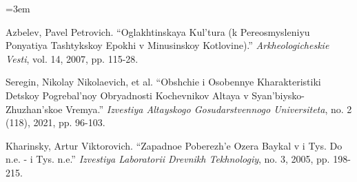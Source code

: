 \documentclass[10pt,onecolumn]{intellte}
\newlength{\csllabelwidth}
\newenvironment{CSLReferences}[2]
 {\par\vspace{2pt}%
  \begin{list}{}{%
  \normalfont\rmfamily\mdseries\fontsize{10pt}{15pt}\selectfont\raggedright
  \hyphenpenalty=50\exhyphenpenalty=50\emergencystretch=3em%
  \renewcommand{\bibitem}[2][]{\item\hypertarget{##2}{}}%
  \setlength{\lineskiplimit}{-6pt}%
  \setlength{\leftmargin}{\csllabelwidth}%
  \setlength{\itemindent}{-\csllabelwidth}%
  \setlength{\labelwidth}{\csllabelwidth}%
  \setlength{\labelsep}{0pt}%
  \setlength{\parsep}{0pt}%
  \setlength{\topsep}{0pt}%
  \setlength{\partopsep}{0pt}%
  \setlength{\itemsep}{2pt}}}
 {\end{list}}
\newcommand{\CSLLeftMargin}[1]{\makebox[\csllabelwidth][l]{\normalfont\rmfamily\mdseries\fontsize{10pt}{15pt}\selectfont #1}}
\newcommand{\CSLRightInline}[1]{\normalfont\rmfamily\mdseries\fontsize{10pt}{15pt}\selectfont #1}
\begin{document}
\begin{CSLReferences}{0}{0}
\CSLLeftMargin{25. }%
\CSLRightInline{Azbelev, Pavel Petrovich. {``Oglakhtinskaya Kul'tura (k
Pereosmysleniyu Ponyatiya Tashtykskoy Epokhi v Minusinskoy
Kotlovine).''} \emph{Arkheologicheskie Vesti}, vol. 14, 2007, pp.
115-28.}

\CSLLeftMargin{26. }%
\CSLRightInline{Seregin, Nikolay Nikolaevich, et al. {``Obshchie i
Osobennye Kharakteristiki Detskoy Pogrebal'noy Obryadnosti Kochevnikov
Altaya v Syan'biysko-Zhuzhan'skoe Vremya.''} \emph{Izvestiya Altayskogo
Gosudarstvennogo Universiteta}, no. 2 (118), 2021, pp. 96-103.}

\CSLLeftMargin{27. }%
\CSLRightInline{Kharinsky, Artur Viktorovich. {``Zapadnoe Poberezh'e
Ozera Baykal v i Tys. Do n.e. - i Tys. n.e.''} \emph{Izvestiya
Laboratorii Drevnikh Tekhnologiy}, no. 3, 2005, pp. 198-215.}

\end{CSLReferences}
\end{document}
